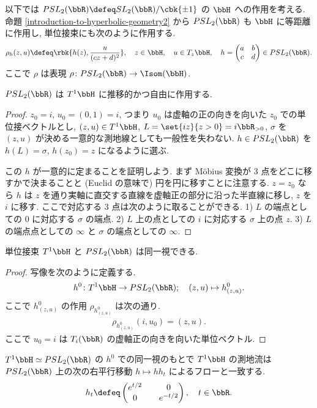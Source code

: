 \documentclass[openany, a4paper, oneside]{jsbook}
\begin{document}
以下では $PSL_2(\bbR) \defeq SL_2(\bbR) / \cbk{\pm 1}$ の $\bbH$ への作用を考える.
命題 \ref{introduction-to-hyperbolic-geometry2} から $PSL_2(\bbR)$ も $\bbH$ に等距離に作用し,
単位接束にも次のように作用する.
\begin{align}
 \rho_h(z, u)
 \defeq
 \rbk{h(z), \frac{u}{(c z + d)^2}},
  \quad z \in \bbH,
  \quad u \in T_z \bbH,
  \quad h =
  \begin{pmatrix}
   a & b \\
   c & d
  \end{pmatrix} \in PSL_2(\bbR).
\end{align}
ここで $\rho$ は表現 $\rho \colon PSL_2(\bbR) \to \Isom (\bbH)$.
\begin{prop}
 $PSL_2(\bbR)$ は $T^1 \bbH$ に推移的かつ自由に作用する.
\end{prop}
\begin{proof}
$z_0 = i$, $u_0 = (0, 1) = i$, つまり $u_0$ は虚軸の正の向きを向いた $z_0$ での単位接ベクトルとし,
$(z, u) \in T^1 \bbH$, $L = \set{iz}{z > 0} = i \bbR_{>0}$,
$\sigma$ を $(z, u)$ が決める一意的な測地線としても一般性を失わない.
$h \in PSL_2(\bbR)$ を $h (L) = \sigma$, $h(z_0) = z$ になるように選ぶ.

この $h$ が一意的に定まることを証明しよう.
まず M\"obius 変換が 3 点をどこに移すかで決まることと (Euclid の意味で) 円を円に移すことに注意する.
$z = z_0$ なら $h$ は $z$ を通り実軸に直交する直線を虚軸正の部分に沿った半直線に移し, $z$ を $i$ に移す.
ここで対応する 3 点は次のように取ることができる.
1) $L$ の端点としての $0$ に対応する $\sigma$ の端点.
2) $L$ 上の点としての $i$ に対応する $\sigma$ 上の点 $z$.
3) $L$ の端点点としての $\infty$ と $\sigma$ の端点としての $\infty$.
\end{proof}
\begin{cor}\label{introduction-to-hyperbolic-geometry9}
 単位接束 $T^1 \bbH$ と $PSL_2(\bbR)$ は同一視できる.
\end{cor}
\begin{proof}
写像を次のように定義する.
\begin{align}
 h^0 \colon T^1 \bbH \to PSL_2(\bbR); \quad
 (z, u) \mapsto h_{(z, u)}^0.
\end{align}
ここで $h_{(z, u)}^0$ の作用 $\rho_{h_{(z, u)}^0}$ は次の通り.
\begin{align}
 \rho_{h_{(z, u)}^0} (i, u_0)
 =
 (z, u).
\end{align}
ここで $u_0 = i$ は $T_i (\bbR)$ の虚軸正の向きを向いた単位ベクトル.
\end{proof}
\begin{prop}\label{introduction-to-hyperbolic-geometry10}
 $T^1 \bbH \simeq PSL_2(\bbR)$ の $h^0$ での同一視のもとで
 $T^1 \bbH$ の測地流は $PSL_2(\bbR)$ 上の次の右平行移動 $h \mapsto hh_t$ によるフローと一致する.
\begin{align}
 h_t
 \defeq
 \begin{pmatrix}
  e^{t/2} && 0 \\
  0       && e^{-t/2}
 \end{pmatrix}, \quad t \in \bbR.
\end{align}
\end{prop}
\end{document}
